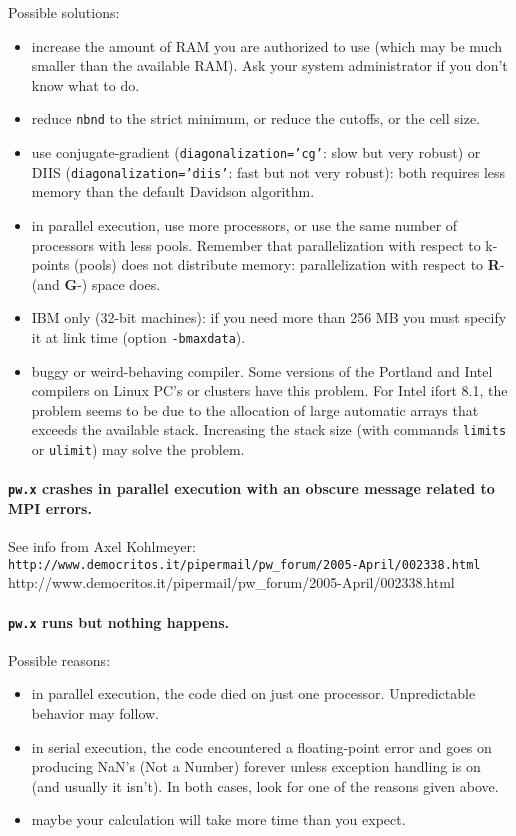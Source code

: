 \documentclass[12pt,a4paper]{article}
\begin{document}
Possible solutions:
\begin{itemize}
  \item
    increase the amount of RAM you are authorized to use (which may be
    much smaller than the available RAM).
    Ask your system administrator if you don't know what to do.
  \item
    reduce \texttt{nbnd} to the strict minimum, or reduce the cutoffs,
    or the cell size.
  \item
    use conjugate-gradient (\texttt{diagonalization='cg'}: slow 
    but very robust) or DIIS (\texttt{diagonalization='diis'}: 
    fast but not very robust):
    both requires less memory than the default Davidson algorithm.
  \item
    in parallel execution, use more processors, or use the same number
    of processors with less pools.
    Remember that parallelization with respect to k-points (pools)
    does not distribute memory: parallelization with respect to
    \textbf{R}- (and \textbf{G}-) space does.
  \item
    IBM only (32-bit machines): if you need more than 256 MB you must
    specify it at link time (option \texttt{-bmaxdata}).
  \item
    buggy or weird-behaving compiler.
    Some versions of the Portland and Intel compilers on Linux PC's 
    or clusters have this problem. For Intel ifort 8.1, the problem
    seems to be due to the allocation of large automatic arrays
    that exceeds the available stack. Increasing the stack size 
    (with commands \texttt{limits} or \texttt{ulimit}) may solve the
    problem.
\end{itemize}

\paragraph{\texttt{pw.x} crashes in parallel execution with an obscure
            message related to MPI errors.}

See info from Axel Kohlmeyer:\hfill\break
\htmladdnormallink%
{{\small\texttt{http://www.democritos.it/pipermail/pw\_forum/2005-April/002338.html}}}%
{http://www.democritos.it/pipermail/pw_forum/2005-April/002338.html}

\paragraph{\texttt{pw.x} runs but nothing happens.}

Possible reasons:
\begin{itemize}
  \item
    in parallel execution, the code died on just one processor.
    Unpredictable behavior may follow.
  \item
    in serial execution, the code encountered a floating-point error
    and goes on producing NaN's (Not a Number) forever unless
    exception handling is on (and usually it isn't).
    In both cases, look for one of the reasons given above.
  \item
    maybe your calculation will take more time than you expect.
\end{itemize}
\end{document}
